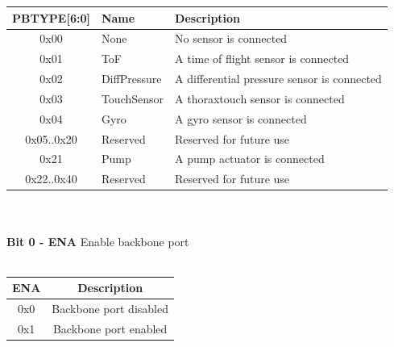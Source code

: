 \begin{tabular}{|c|l|l|}
    \hline
    PBTYPE[6:0] & Name & Description \\ \hline
    0x00 & None & No sensor is connected\\ \hline
    0x01 & ToF & A time of flight sensor is connected\\ \hline
    0x02 & DiffPressure & A differential pressure sensor is connected\\ \hline
    0x03 & TouchSensor & A thoraxtouch sensor is connected\\ \hline
    0x04 & Gyro & A gyro sensor is connected\\ \hline
    0x05..0x20 & Reserved & Reserved for future use\\ \hline
    0x21 & Pump & A pump actuator is connected\\ \hline
    0x22..0x40 & Reserved & Reserved for future use \\ \hline
\end{tabular}
\\\\
\textbf{Bit 0 - ENA} Enable backbone port\\\\
\begin{tabular}{|c|c|}
    \hline
   ENA & Description\\ \hline
   0x0 & Backbone port disabled\\ \hline
   0x1 & Backbone port enabled \\ \hline
\end{tabular}

\pagebreak

